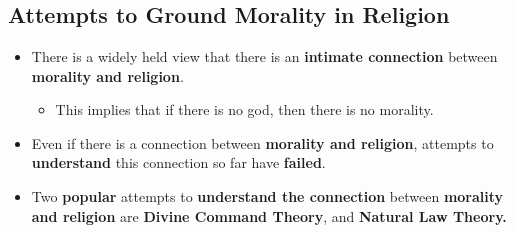 \documentclass[16pt]{article}
\begin{document}
    \section*{}

    \subsection*{Attempts to Ground Morality in Religion}
    \begin{itemize}
        \item There is a widely held view that there is an \textbf{intimate connection} between \textbf{morality and religion}.
        \begin{itemize}
            \item This implies that if there is no god, then there is no morality.
        \end{itemize}
        \item Even if there is a connection between \textbf{morality and religion}, attempts to \textbf{understand} this connection so far have \textbf{failed}.
        \item Two \textbf{popular} attempts to \textbf{understand the connection} between \textbf{morality and religion} are \textbf{Divine Command Theory}, and \textbf{Natural Law Theory.}
    \end{itemize}
\end{document}
